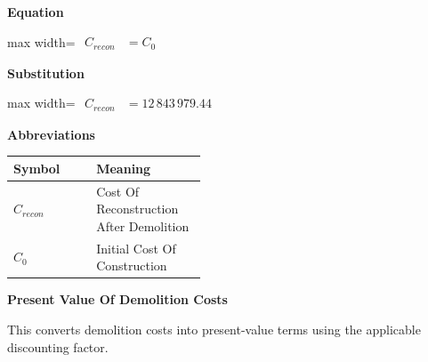 \documentclass{article}
\begin{document}
\vspace{0.4em}
\textbf{Equation}\par\vspace{-0.35em}
\begin{center}
\begin{adjustbox}{max width=\linewidth}
$\displaystyle\begin{aligned}
C_{recon} &= C_0
\end{aligned}$
\end{adjustbox}
\end{center}
\vspace{0.4em}
\textbf{Substitution}\par\vspace{-0.35em}
\begin{center}
\begin{adjustbox}{max width=\linewidth}
$\displaystyle\begin{aligned}
C_{recon} &= 12\,843\,979.44
\end{aligned}$
\end{adjustbox}
\end{center}
\vspace{0.4em}
\textbf{Abbreviations}\par\vspace{-0.35em}
\begin{tabularx}{\linewidth}{>{\raggedright\arraybackslash}p{0.43\linewidth} >{\raggedright\arraybackslash}X}
\toprule
Symbol & Meaning \\
\midrule
$C_{recon}$ & Cost Of Reconstruction After Demolition \\
$C_0$ & Initial Cost Of Construction \\
\bottomrule
\end{tabularx}
\vspace{0.6em}
\vspace{0.4em}
\textbf{Present Value Of Demolition Costs}\par\vspace{-0.35em}
This converts demolition costs into present-value terms using the applicable discounting factor.
\end{document}
